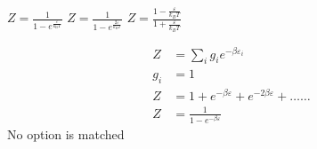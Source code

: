 \begin{enumerate}
\begin{tasks}
		\task[\textbf{B.}] $Z=\frac{1}{1-e^{\frac{\varepsilon}{k_{\mathrm{B}} T}}}$
		\task[\textbf{C.}] $Z=\frac{1}{1-e^{\frac{2 \varepsilon}{k_{B} T}}}$
		\task[\textbf{D.}] $Z=\frac{1-\frac{\varepsilon}{k_{B} T}}{1+\frac{\varepsilon}{k_{B} T}}$
	\end{tasks}
	\begin{answer}
		\begin{align*}
		Z&=\sum_{i} g_{i} e^{-\beta \varepsilon_{i}}\\
		g_{i}&=1\\
		Z&=1+e^{-\beta \varepsilon}+e^{-2 \beta \varepsilon}+\ldots \ldots\\
		Z&=\frac{1}{1-e^{-\beta \varepsilon}}
		\end{align*}
		No option is matched
	\end{answer}	
\end{enumerate}